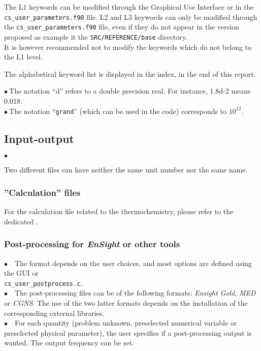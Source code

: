 The L1 keywords can be modified through the Graphical Use Interface or
in the \texttt{cs\_user\_parameters.f90} file. L2 and L3 keywords can only be modified through
the \texttt{cs\_user\_parameters.f90} file, even if they do not appear in the version proposed
as example it the \texttt{SRC/REFERENCE/base} directory.\\
It is however recommended not to modify the keywords which do not belong to the L1
level.

The alphabetical keyword list is displayed in the index, in the end of
this report.

$\bullet\ $The notation ``d'' refers to a double precision real. For
           instance, 1.8d-2 means 0.018. \\
$\bullet\ $The notation ``{\tt grand}'' (which can be used in the code)
corresponds to $10^{12}$.

\subsection{Input-output}

\begin{list}{$\bullet$}{}
\item Two different files can have neither the same unit number nor the
      same name.
\end{list}

\subsubsection{''Calculation'' files}



For the calculation file related to the thermochemistry, please refer
to the dedicated .

\subsubsection{Post-processing for {\em EnSight} or other tools}

$\bullet\quad$The format depends on the user choices, and most options
are defined using the GUI or \\
\texttt{cs\_user\_postprocess.c}.\\
$\bullet\quad$The post-processing files can be of the following formats: {\em Ensight Gold},
{\em MED} or {\em CGNS}. The use of the two latter formats depends on
the installation of the corresponding external libraries.\\
$\bullet\quad$For each quantity (problem unknown, preselected numerical
variable or preselected physical parameter), the user specifies if a
post-processing output is wanted. The output frequency can be set.\\

